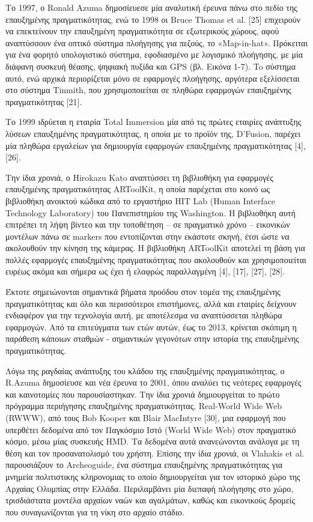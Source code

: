 Το 1997, ο Ronald Azuma δημοσίευεσε μία αναλυτική έρευνα πάνω στο πεδίο της επαυξημένης πραγματικότητας\cite{azuma1997}, ενώ το 1998 οι Bruce Thomas et al. [25] επιχειρούν να επεκτείνουν την επαυξημένη πραγματικότητα σε εξωτερικούς χώρους, αφού αναπτύσσουν ένα οπτικό σύστημα πλοήγησης για πεζούς, το «Map-in-hat». Πρόκειται για ένα φορητό υπολογιστικό σύστημα, εφοδιασμένο με λογισμικό πλοήγησης, με μία διάφανη συσκευή θέασης, ψηφιακή πυξίδα και GPS (βλ. Εικόνα 1-7). To σύστημα αυτό, ενώ αρχικά περιορίζεται μόνο σε εφαρμογές πλοήγησης, αργότερα εξελίσσεται στο σύστημα Tinmith, που χρησιμοποιείται σε πληθώρα εφαρμογών επαυξημένης πραγματικότητας [21].

Το 1999 ιδρύεται η εταιρία Total Immersion μία από τις πρώτες εταιρίες ανάπτυξης λύσεων επαυξημένης πραγματικότητας, η οποία με το προϊόν της, D’Fusion, παρέχει μία πληθώρα εργαλείων για δημιουργία εφαρμογών επαυξημένης πραγματικότητας [4], [26].

Την ίδια χρονιά, ο Hirokazu Kato αναπτύσσει τη βιβλιοθήκη για εφαρμογές επαυξημένης πραγματικότητας ARToolKit, η οποία παρέχεται στο κοινό ως βιβλιοθήκη ανοικτού κώδικα από το εργαστήριο ΗΙΤ Lab (Human Interface Technology Laboratory) του Πανεπιστημίου της Washington. H βιβλιοθήκη αυτή επιτρέπει τη λήψη βίντεο και την τοποθέτηση – σε πραγματικό χρόνο – εικονικών μοντέλων πάνω σε markers που εντοπίζονται στην εκάστοτε σκηνή, έτσι ώστε να ακολουθούν την κίνηση της κάμερας. Η βιβλιοθήκη ARToolKit αποτελεί τη βάση για πολλές εφαρμογές επαυξημένης πραγματικότητας που ακολουθούν και χρησιμοποιείται ευρέως ακόμα και σήμερα ως έχει ή ελαφρώς παραλλαγμένη [4], [17], [27], [28]. 



Έκτοτε σημειώνονται σημαντικά βήματα προόδου στον τομέα της επαυξημένης πραγματικότητας και όλο και περισσότεροι επιστήμονες, αλλά και εταιρίες δείχνουν ενδιαφέρον για την τεχνολογία αυτή, με αποτέλεσμα να αναπτύσσεται πληθώρα εφαρμογών. Από τα επιτεύγματα των ετών αυτών, έως το 2013, κρίνεται σκόπιμη η παράθεση κάποιων σταθμών - σημαντικών γεγονότων στην ιστορία της επαυξημένης πραγματικότητας.

Λόγω της ραγδαίας ανάπτυξης του κλάδου της επαυξημένης πραγματικότητας, ο R.Azuma δημοσίευσε και νέα έρευνα το 2001\cite{azuma2001}, όπου αναλύει τις νεότερες εφαρμογές και καινοτομίες που παρουσίαστηκαν.
Την ίδια χρονιά δημιουργείται το πρώτο πρόγραμμα περιήγησης επαυξημένης πραγματικότητας, Real-World Wide Web (RWWW), από τους Bob Kooper και Blair MacIntyre [30], μια εφαρμογή που υπερθέτει δεδομένα από τον Παγκόσμιο Ιστό (World Wide Web) στον πραγματικό κόσμο, μέσω μίας συσκευής HMD. Τα δεδομένα αυτά ανανεώνονται ανάλογα με τη θέση και τον προσανατολισμό του χρήστη.
Επίσης την ίδια χρονιά, οι Vlahakis et al. παρουσιάζουν το Archeoguide, ένα σύστημα επαυξημένης πραγματικότητας για μνημεία πολιτιστικης κληρονομιας 
το οποίο δημιουργείται για τον ιστορικό χώρο της Αρχαίας Ολυμπίας στην Ελλάδα. Περιλαμβάνει μία διεπαφή πλοήγησης στο χώρο, τρισδιάστατα μοντέλα αρχαίων ναών και αγαλμάτων, καθώς και εικονικούς δρομείς που συναγωνίζονται για τη νίκη στο αρχαίο στάδιο.


